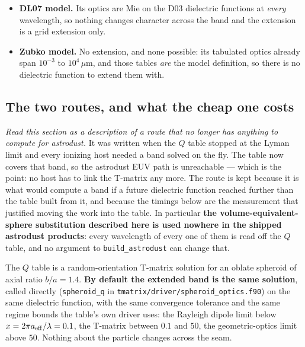\documentclass{my_memo}
\newcommand{\code}[1]{\texttt{#1}}
\newcommand{\um}{\ensuremath{\,\mu\mathrm{m}}}
\begin{document}
\begin{itemize}
      smallest PAH the size distribution populates ($4.22\times10^{-4}$\um).
      \emph{This branch is unreachable on the unextended grid}: its shortest
      wavelength gives $1/\lambda = 10.96 < 17.25$, so every previous result is
      unaffected.
\item \textbf{DL07 model.} Its optics are Mie on the D03 dielectric functions at
      \emph{every} wavelength, so nothing changes character across the band and
      the extension is a grid extension only.
\item \textbf{Zubko model.} No extension, and none possible: its tabulated
      optics already span $10^{-3}$ to $10^{4}$\um, and those tables \emph{are}
      the model definition, so there is no dielectric function to extend them
      with.
\end{itemize}

\subsection{The two routes, and what the cheap one costs}\label{sec:euv-shape}

\emph{Read this section as a description of a route that no longer has anything
to compute for astrodust.} It was written when the $Q$ table stopped at the Lyman
limit and every ionizing host needed a band solved on the fly. The table now
covers that band, so the astrodust EUV path is unreachable --- which is the
point: no host has to link the T-matrix any more. The route is kept because it
is what would compute a band if a future dielectric function reached further
than the table built from it, and because the timings below are the measurement
that justified moving the work into the table. In particular \textbf{the
volume-equivalent-sphere substitution described here is used nowhere in the
shipped astrodust products}: every wavelength of every one of them is read off
the $Q$ table, and no argument to \code{build\_astrodust} can change that.

The $Q$ table is a random-orientation T-matrix solution for an oblate spheroid
of axial ratio $b/a = 1.4$. \textbf{By default the extended band is the same
solution}, called directly (\code{spheroid\_q} in
\code{tmatrix/driver/spheroid\_optics.f90}) on the same dielectric function,
with the same convergence tolerance and the same regime bounds the table's own
driver uses: the Rayleigh dipole limit below $x = 2\pi a_{\rm eff}/\lambda =
0.1$, the T-matrix between $0.1$ and $50$, the geometric-optics limit above
$50$. Nothing about the particle changes across the seam.
\end{document}
